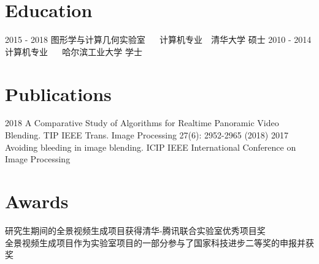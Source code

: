 \documentclass[]{cv-style} %
\begin{document}
\section{Education}
\begin{entrylist}
\vspace{-5pt}
\entry
{2015 - 2018}
{图形学与计算几何实验室 {\normalfont ~~ 计算机专业~~清华大学}}
{ 硕士}
{}
\vspace{-7pt}
\entry
{2010 - 2014}
{计算机专业 {\normalfont ~~ 哈尔滨工业大学}}
{ 学士}
{ }
\end{entrylist}
\vspace{-5pt} 
\section{Publications}
\begin{entrylist}
\entry
{2018}
{A Comparative Study of Algorithms for Realtime Panoramic Video Blending.}
{TIP}
{ IEEE Trans. Image Processing 27(6): 2952-2965 (2018)}
\entry
{2017}
{Avoiding bleeding in image blending.}
{ICIP}
{IEEE International Conference on Image Processing}
\end{entrylist}
\section{Awards}
\begin{entrylist}
  \vspace{5pt}
   研究生期间的全景视频生成项目获得清华-腾讯联合实验室优秀项目奖\\
  全景视频生成项目作为实验室项目的一部分参与了国家科技进步二等奖的申报并获奖
\end{entrylist}
\end{document}
